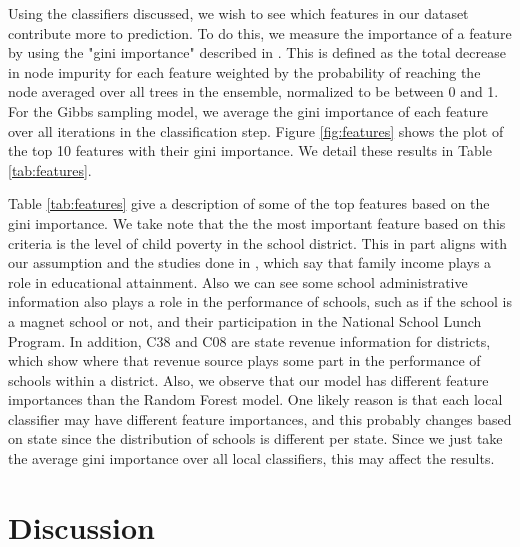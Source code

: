 Using the classifiers discussed, we wish to see which features in our dataset contribute more to prediction. To do this, we measure the importance of a feature by using the "gini importance" described in \cite{breiman1984classification}. This is defined as the total decrease in node impurity for each feature weighted by the probability of reaching the node averaged over all trees in the ensemble, normalized to be between 0 and 1. For the Gibbs sampling model, we average the gini importance of each feature over all iterations in the classification step. Figure \ref{fig:features} shows the plot of the top 10 features with their gini importance. We detail these results in Table \ref{tab:features}.

Table \ref{tab:features} give a description of some of the top features based on the gini importance. We take note that the the most important feature based on this criteria is the level of child poverty in the school district. This in part aligns with our assumption and the studies done in \cite{income2002greg,income2015breen}, which say that family income plays a role in educational attainment. Also we can see some school administrative information also plays a role in the performance of schools, such as if the school is a magnet school or not, and their participation in the National School Lunch Program. In addition, C38 and C08 are state revenue information for districts, which show where that revenue source plays some part in the performance of schools within a district. Also, we observe that our model has different feature importances than the Random Forest model. One likely reason is that each local classifier may have different feature importances, and this probably changes based on state since the distribution of schools is different per state. Since we just take the average gini importance over all local classifiers, this may affect the results.

\section{Discussion} \label{sec:discuss}

